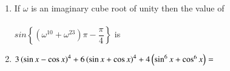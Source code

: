 \documentclass[journal,12pt,twocolumn]{IEEEtran}
\theoremstyle{remark}
\begin{document}
\begin{enumerate}
\begin{enumerate}[label={(\alph*)}]
\begin{multicols}{2}
            \end{multicols}

        \end{enumerate}

    \item If $\omega$ is an imaginary cube root of unity then the value of\\\\$sin\left\{(\omega^{10} + \omega^{23})\pi - \dfrac{\pi}{4}\right\}$ is
    
        \begin{enumerate}[label={(\alph*)}]
        \end{enumerate}

    \item $3\left(\sin{x} - \cos{x}\right)^4 + 6\left(\sin{x} + \cos{x}\right)^4 + 4\left(\sin^6{x}+\cos^6{x}\right) =$
        
        \begin{enumerate}[label={(\alph*)}]
        \end{enumerate}   


\end{enumerate}
\end{document}
